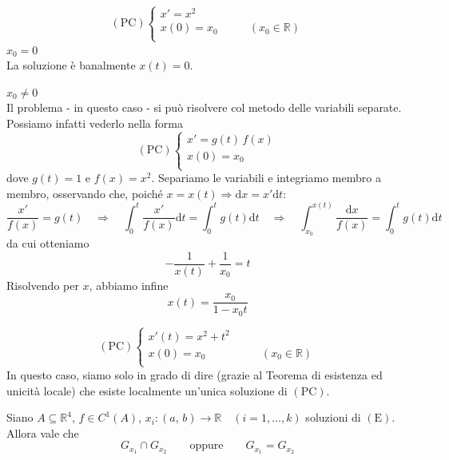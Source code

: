 \begin{example}
$$
\mathrm{(PC)}
\begin{cases}
x' = x^2\\
x(0) = x_0 &\qquad (x_0 \in \mathbb{R})\\
\end{cases}
$$
\noindent\underline{$x_0=0$}\\
La soluzione è banalmente $x(t) = 0$.

\noindent\underline{$x_0 \neq 0$}\\
Il problema - in questo caso - si può risolvere col metodo delle variabili separate. Possiamo infatti vederlo nella forma
$$
\mathrm{(PC)}
\begin{cases}
x' = g(t) \, f(x)\\
x(0) = x_0\\
\end{cases}
$$
dove $g(t) = 1$ e $f(x) = x^2$. Separiamo le variabili e integriamo membro a membro, osservando che, poiché $x = x(t) \Rightarrow \mathrm{d}x = x' \mathrm{d}t$:
$$
\frac{x'}{f(x)} = g(t)
\quad\Longrightarrow\quad
\int_{0}^{t} \frac{x'}{f(x)} \mathrm{d}t = \int_{0}^{t} g(t) \mathrm{d}t
\quad\Longrightarrow\quad
\int_{x_0}^{x(t)} \frac{\mathrm{d}x}{f(x)} = \int_{0}^{t} g(t) \mathrm{d}t
$$
da cui otteniamo
$$
- \frac{1}{x(t)} + \frac{1}{x_0} = t
$$
Risolvendo per $x$, abbiamo infine
$$
x(t) = \frac{x_0}{1-x_0t}
$$
\end{example}

\begin{example}
$$
\mathrm{(PC)}
\begin{cases}
x'(t) = x^2 + t^2\\
x(0) = x_0 &\qquad (x_0 \in \mathbb{R})\\
\end{cases}
$$
In questo caso, siamo solo in grado di dire (grazie al Teorema di esistenza ed unicità locale) che esiste localmente un'unica soluzione di $\mathrm{(PC)}$.
\end{example}

\begin{obs}
Siano $A \subseteq \mathbb{R}^4$, $f \in C^1(A)$, $x_i : (a,\,b) \longrightarrow \mathbb{R} \quad (i = 1,\ldots,k)$ soluzioni di $\mathrm{(E)}$. Allora vale che
$$
G_{x_1} \cap G_{x_2} \qquad\text{oppure}\qquad G_{x_1} = G_{x_2}
$$
\end{obs}

